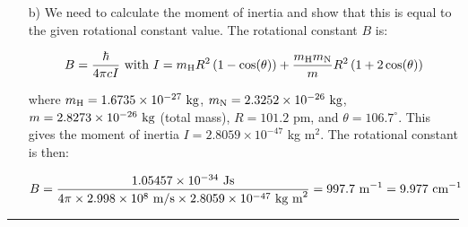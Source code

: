 \begin{itemize}
\item[b)] We need to calculate the moment of inertia and show that this is equal to the given rotational constant value. The rotational constant $B$ is:

$$B = \frac{\hbar}{4\pi cI}\textnormal{ with }I = m_\textnormal{H}R^2\left(1 - \cos(\theta)\right) + \frac{m_\textnormal{H}m_\textnormal{N}}{m}R^2\left(1 + 2\cos(\theta)\right)$$

where $m_\textnormal{H} = 1.6735\times 10^{-27}\textnormal{ kg}$, $m_\textnormal{N} = 2.3252\times 10^{-26}\textnormal{ kg}$, $m = 2.8273\times 10^{-26}\textnormal{ kg}$ (total mass), $R = 101.2$ pm, and $\theta = 106.7^\circ$. This gives the moment of inertia $I = 2.8059\times 10^{-47}$ kg m$^2$. The rotational constant is then:

$$B = \frac{1.05457\times 10^{-34}\textnormal{ Js}}{4\pi\times 2.998\times 10^8\textnormal{ m/s}\times 2.8059\times 10^{-47}\textnormal{ kg m}^2} = 997.7\textnormal{ m}^{-1} = 9.977\textnormal{ cm}^{-1}$$



\end{itemize}

\hrule\vspace{0.5cm}



